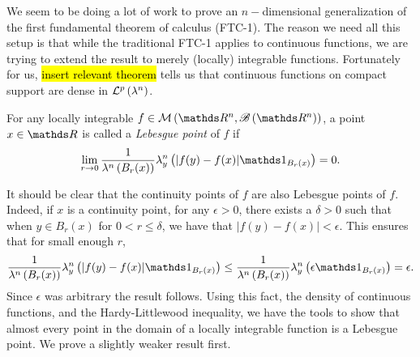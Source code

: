 We seem to be doing a lot of work to prove an $n-$dimensional generalization of the first fundamental theorem of calculus (FTC-1). The reason we need all this setup is that while the traditional FTC-1 applies to continuous functions, we are trying to extend the result to merely (locally) integrable functions. Fortunately for us, \hl{insert relevant theorem} tells us that continuous functions on compact support are dense in $\mathcal{L}^{p}\left(\lambda^n\right)$.
\begin{defn}
	For any locally integrable $f \in \mathcal{M}\left(\R^n , \borel \left(\R^n\right)\right)$, a point $x \in \R$ is called a \emph{Lebesgue point} of $f$ if
	\[
		\lim_{r\to 0} \frac{1}{\lambda^n\left(B_r(x)\right)} \lambda^n_y\left(\lvert f(y) - f(x) \rvert \indicate_{B_r(x)}\right) = 0.
	\]
\end{defn}

It should be clear that the continuity points of $f$ are also Lebesgue points of $f$. Indeed, if $x$ is a continuity point, for any $\epsilon > 0$, there exists a $\delta > 0 $ such that when $y \in B_r(x)$ for $0< r \leq \delta$, we have that $\lvert f(y) - f(x) \rvert < \epsilon$. This ensures that for small enough $r$, 
\[
	\frac{1}{\lambda^n\left(B_r(x)\right)} \lambda^n_y\left(\lvert f(y) - f(x) \rvert \indicate_{B_r(x)}\right) \leq \frac{1}{\lambda^n\left(B_r(x)\right)} \lambda^n_y\left(\epsilon \indicate_{B_r(x)}\right) = \epsilon.
\]
Since $\epsilon$ was arbitrary the result follows. Using this fact, the density of continuous functions, and the Hardy-Littlewood inequality, we have the tools to show that almost every point in the domain of a locally integrable function is a Lebesgue point. We prove a slightly weaker result first.

